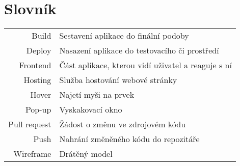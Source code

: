 
\chapter{Slovník}

\begin{tabular}{rp{}}
    Build               & Sestavení aplikace do finální podoby \\
    Deploy              & Nasazení aplikace do testovacího či prostředí \\
    Frontend            & Část aplikace, kterou vidí uživatel a reaguje s ní \\
    Hosting             & Služba hostování webové stránky \\
    Hover               & Najetí myši na prvek \\
    Pop-up              & Vyskakovací okno \\
    Pull request        & Žádost o změnu ve zdrojovém kódu \\
    Push                & Nahrání změněného kódu do repozitáře \\
    Wireframe           & Drátěný model \\
\end{tabular}
